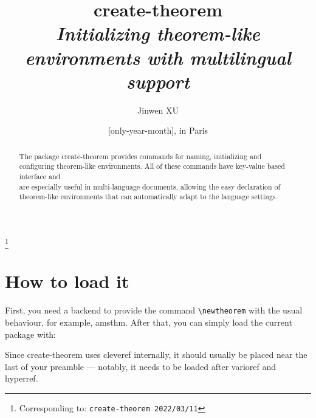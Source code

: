 \documentclass[classical]{einfart}
\newenvironment{tip}[1][Tip]{%
    \LocallyStopLineNumbers%
    \begin{tcolorbox}[breakable,
        enhanced,
        width = \textwidth,
        colback = paper, colbacktitle = paper,
        colframe = gray!50, boxrule=0.2mm,
        coltitle = black,
        fonttitle = \sffamily,
        attach boxed title to top left = {yshift=-\tcboxedtitleheight/2, xshift=.5cm},
        boxed title style = {boxrule=0pt, colframe=paper},
        before skip = 3mm,
        after skip = 3mm,
        top = 2.5mm,
        bottom = 1.5mm,
        title={\scshape\sffamily #1}]%
}{\end{tcolorbox}\ResumeLineNumbers}
\newcommand{\createtheorempackage}{\textsf{create-theorem}}
\begin{document}
\def\PackageVersion{2022/03/11}

\title{\createtheorempackage{}\\\smallskip\itshape Initializing theorem-like environments with multilingual support}
\author{Jinwen XU}
\thanks{Corresponding to: \texttt{\createtheorempackage{} \PackageVersion}}
\date{\TheDate{\PackageVersion}[only-year-month], in Paris}

\maketitle

\begin{abstract}
    \raggedleft
    The package \createtheorempackage{} provides commands for naming, initializing and configuring theorem-like environments. All of these commands have key-value based interface and \\are especially useful in multi-language documents, allowing the easy declaration of \\theorem-like environments that can automatically adapt to the language settings.
\end{abstract}

\vspace{-.5\baselineskip}



\section{How to load it}

First, you need a backend to provide the command \lstinline|\newtheorem| with the usual behaviour, for example, \textsf{amsthm}. After that, you can simply load the current package with:

\begin{code}
\usepackage{create-theorem}
\end{code}

\begin{tip}
    Since \createtheorempackage{} uses \textsf{cleveref} internally, it should usually be placed near the last of your preamble --- notably, it needs to be loaded after \textsf{varioref} and \textsf{hyperref}.
\end{tip}
\end{document}
